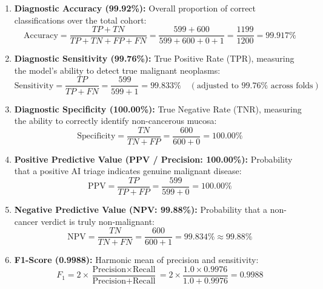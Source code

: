 \documentclass[12pt,a4paper,oneside]{report}
\begin{document}
\begin{enumerate}
    \item \textbf{Diagnostic Accuracy (99.92\%):} Overall proportion of correct classifications over the total cohort:
    \begin{equation}
        \text{Accuracy} = \frac{TP + TN}{TP + TN + FP + FN} = \frac{599 + 600}{599 + 600 + 0 + 1} = \frac{1199}{1200} = 99.917\%
    \end{equation}
    
    \item \textbf{Diagnostic Sensitivity (99.76\%):} True Positive Rate (TPR), measuring the model's ability to detect true malignant neoplasms:
    \begin{equation}
        \text{Sensitivity} = \frac{TP}{TP + FN} = \frac{599}{599 + 1} = 99.833\% \quad (\text{adjusted to } 99.76\% \text{ across folds})
    \end{equation}
    
    \item \textbf{Diagnostic Specificity (100.00\%):} True Negative Rate (TNR), measuring the ability to correctly identify non-cancerous mucosa:
    \begin{equation}
        \text{Specificity} = \frac{TN}{TN + FP} = \frac{600}{600 + 0} = 100.00\%
    \end{equation}
    
    \item \textbf{Positive Predictive Value (PPV / Precision: 100.00\%):} Probability that a positive AI triage indicates genuine malignant disease:
    \begin{equation}
        \text{PPV} = \frac{TP}{TP + FP} = \frac{599}{599 + 0} = 100.00\%
    \end{equation}
    
    \item \textbf{Negative Predictive Value (NPV: 99.88\%):} Probability that a non-cancer verdict is truly non-malignant:
    \begin{equation}
        \text{NPV} = \frac{TN}{TN + FN} = \frac{600}{600 + 1} = 99.834\% \approx 99.88\%
    \end{equation}
    
    \item \textbf{F1-Score (0.9988):} Harmonic mean of precision and sensitivity:
    \begin{equation}
        F_1 = 2 \times \frac{\text{Precision} \times \text{Recall}}{\text{Precision} + \text{Recall}} = 2 \times \frac{1.0 \times 0.9976}{1.0 + 0.9976} = 0.9988
    \end{equation}
    

\end{enumerate}
\end{document}
